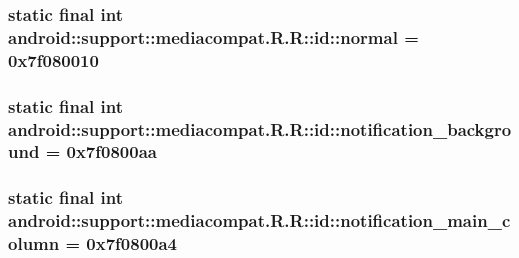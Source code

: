 \hypertarget{classandroid_1_1support_1_1mediacompat_1_1_r_1_1id_89da4da44e0b69479738eed0e2d7aec4}{
\subsubsection[{normal}]{\setlength{\rightskip}{0pt plus 5cm}static final int android::support::mediacompat.R.R::id::normal = 0x7f080010}}
\label{classandroid_1_1support_1_1mediacompat_1_1_r_1_1id_89da4da44e0b69479738eed0e2d7aec4}


\hypertarget{classandroid_1_1support_1_1mediacompat_1_1_r_1_1id_ec39d126ef8f583792f1192110fbafba}{
\subsubsection[{notification\_\-background}]{\setlength{\rightskip}{0pt plus 5cm}static final int android::support::mediacompat.R.R::id::notification\_\-background = 0x7f0800aa}}
\label{classandroid_1_1support_1_1mediacompat_1_1_r_1_1id_ec39d126ef8f583792f1192110fbafba}


\hypertarget{classandroid_1_1support_1_1mediacompat_1_1_r_1_1id_f12b3ab461a61c8a7cd3113ffcebb27b}{
\subsubsection[{notification\_\-main\_\-column}]{\setlength{\rightskip}{0pt plus 5cm}static final int android::support::mediacompat.R.R::id::notification\_\-main\_\-column = 0x7f0800a4}}
\label{classandroid_1_1support_1_1mediacompat_1_1_r_1_1id_f12b3ab461a61c8a7cd3113ffcebb27b}


